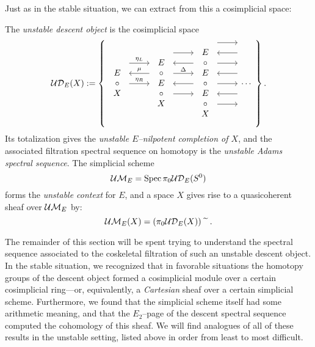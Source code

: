 Just as in the stable situation, we can extract from this a cosimplicial space:
\begin{definition}
The \textit{unstable descent object} is the cosimplicial space
\[\sheaf{UD}_E(X) := \left\{
\begin{tikzcd}
\begin{array}{c} E \\ \circ \\ X \end{array} \arrow[leftarrow, shift left=\baselineskip]{r}{\mu} \arrow[shift left=(2*\baselineskip)]{r}{\eta_L} \arrow{r}{\eta_R} &
\begin{array}{c} E \\ \circ \\ E \\ \circ \\ X \end{array} \arrow[shift left=(3*\baselineskip)]{r} \arrow[leftarrow, shift left=(2*\baselineskip)]{r} \arrow[shift left=\baselineskip]{r}{\Delta} \arrow[leftarrow]{r} \arrow[shift right=\baselineskip]{r} &
\begin{array}{c} E \\ \circ \\ E \\ \circ \\ E \\ \circ \\ X \end{array} \arrow[shift left=(4*\baselineskip)]{r} \arrow[leftarrow, shift left=(3*\baselineskip)]{r} \arrow[shift left=(2*\baselineskip)]{r} \arrow[leftarrow, shift left=\baselineskip]{r} \arrow{r} \arrow[leftarrow, shift right=\baselineskip]{r} \arrow[shift right=(2*\baselineskip)]{r} &
\cdots
\end{tikzcd}
\right\}.\]
Its totalization gives the \textit{unstable \(E\)--nilpotent completion of \(X\)}, and the associated filtration spectral sequence on homotopy is the \textit{unstable Adams spectral sequence}.  The simplicial scheme \[\mathcal{UM}_{E} = \operatorname{Spec} \pi_0 \mathcal{UD}_E(S^0)\] forms the \textit{unstable context} for \(E\), and a space \(X\) gives rise to a quasicoherent sheaf over \(\mathcal{UM}_{E}\) by: \[\mathcal{UM}_{E}(X) = (\pi_0 \mathcal{UD}_E(X))\widetilde{\quad}.\]
\end{definition}

The remainder of this section will be spent trying to understand the spectral sequence associated to the coskeletal filtration of such an unstable descent object.  In the stable situation, we recognized that in favorable situations the homotopy groups of the descent object formed a cosimplicial module over a certain cosimplicial ring---or, equivalently, a \emph{Cartesian} sheaf over a certain simplicial scheme.  Furthermore, we found that the simplicial scheme itself had some arithmetic meaning, and that the \(E_2\)--page of the descent spectral sequence computed the cohomology of this sheaf.  We will find analogues of all of these results in the unstable setting, listed above in order from least to most difficult.

